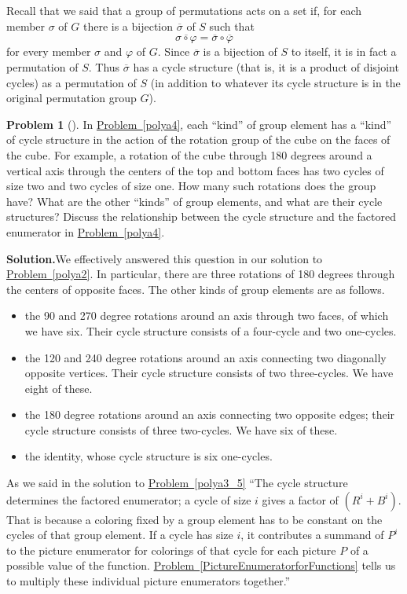 \documentclass[10pt,]{book}
\theoremstyle{plain}
\theoremstyle{definition}
\newtheorem{activity}[project]{Problem}
\theoremstyle{definition}
\numberwithin{equation}{chapter}
\begin{document}
Recall that we said that a group of permutations acts on a set if, for each member \(\sigma\) of \(G\) there is a bijection \(\overline{\sigma}\) of \(S\) such that%
\begin{equation*}
\overline{\sigma\circ\varphi} = \overline{\sigma}\circ\overline{\varphi}
\end{equation*}
for every member \(\sigma\) and \(\varphi\) of \(G\). Since \(\overline{\sigma}\) is a bijection of \(S\) to itself, it is in fact a permutation of \(S\). Thus \(\overline{\sigma}\) has a cycle structure (that is, it is a product of disjoint cycles) as a permutation of \(S\) (in addition to whatever its cycle structure is in the original permutation group \(G\)).%
\begin{activity}[]\label{activity-319}
In \hyperref[polya4]{Problem~\ref{polya4}}, each ``kind'' of group element has a ``kind'' of cycle structure in the action of the rotation group of the cube on the faces of the cube. For example, a rotation of the cube through 180 degrees around a vertical axis through the centers of the top and bottom faces has two cycles of size two and two cycles of size one. How many such rotations does the group have? What are the other ``kinds'' of group elements, and what are their cycle structures? Discuss the relationship between the cycle structure and the factored enumerator in \hyperref[polya4]{Problem~\ref{polya4}}.%
\par\medskip\noindent%
\textbf{Solution.}\quad We effectively answered this question in our solution to \hyperref[polya2]{Problem~\ref{polya2}}. In particular, there are three rotations of 180 degrees through the centers of opposite faces. The other kinds of group elements are as follows. \leavevmode%
\begin{itemize}[label=\textbullet]
\item{}the 90 and 270 degree rotations around an axis through two faces, of which we have six.  Their cycle structure consists of a four-cycle and two one-cycles.%
\item{}the 120 and 240 degree rotations around an axis connecting two diagonally opposite vertices.  Their cycle structure consists of two three-cycles.  We have eight of these.%
\item{}the 180 degree rotations around an axis connecting two opposite edges; their cycle structure consists of three two-cycles.  We have six of these.%
\item{}the identity, whose cycle structure is six one-cycles.%
\end{itemize}
 As we said in the solution to \hyperref[polya3_5]{Problem~\ref{polya3_5}} ``The cycle structure determines the factored enumerator; a cycle of size \(i\) gives a factor of \((R^i+B^i)\). That is because a coloring fixed by a group element has to be constant on the cycles of that group element. If a cycle has size \(i\), it contributes a summand of \(P^i\) to the picture enumerator for colorings of that cycle for each picture \(P\) of a possible value of the function. \hyperref[PictureEnumeratorforFunctions]{Problem~\ref{PictureEnumeratorforFunctions}} tells us to multiply these individual picture enumerators together.''%
\end{activity}
\end{document}
